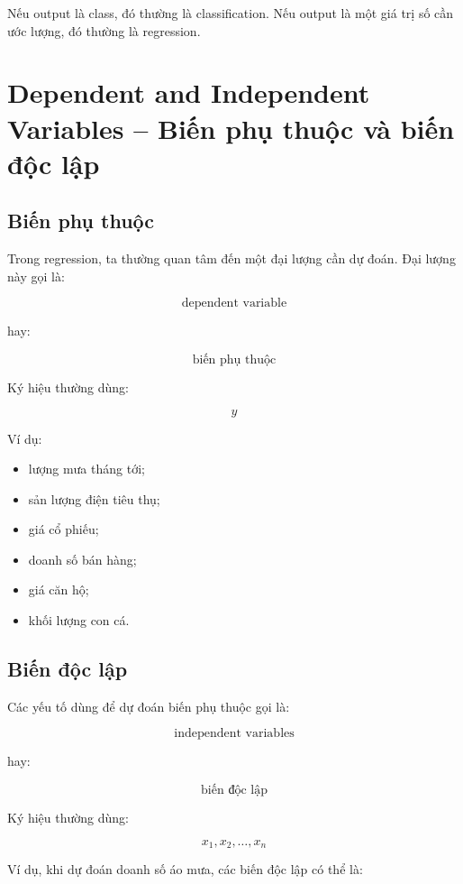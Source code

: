 \begin{ghinho}
Nếu output là class, đó thường là classification. Nếu output là một giá trị số cần ước lượng, đó thường là regression.
\end{ghinho}

\section{Dependent and Independent Variables -- Biến phụ thuộc và biến độc lập}

\subsection{Biến phụ thuộc}

Trong regression, ta thường quan tâm đến một đại lượng cần dự đoán. Đại lượng này gọi là:

\[
    \text{dependent variable}
\]

hay:

\[
    \text{biến phụ thuộc}
\]

Ký hiệu thường dùng:

\[
    y
\]

Ví dụ:

\begin{itemize}
    \item lượng mưa tháng tới;
    \item sản lượng điện tiêu thụ;
    \item giá cổ phiếu;
    \item doanh số bán hàng;
    \item giá căn hộ;
    \item khối lượng con cá.
\end{itemize}

\subsection{Biến độc lập}

Các yếu tố dùng để dự đoán biến phụ thuộc gọi là:

\[
    \text{independent variables}
\]

hay:

\[
    \text{biến độc lập}
\]

Ký hiệu thường dùng:

\[
    x_1,x_2,\ldots,x_n
\]

Ví dụ, khi dự đoán doanh số áo mưa, các biến độc lập có thể là:

